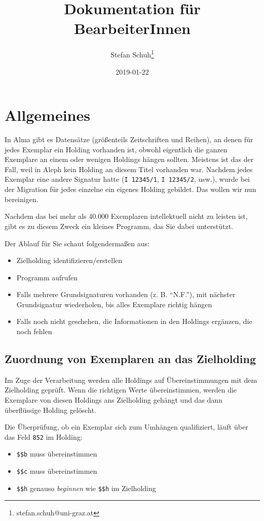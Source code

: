 \documentclass[10pt, a4paper]{scrartcl}
\author{Stefan Schuh\thanks{stefan.schuh@uni-graz.at}}
\date{2019-01-22}
\title{Dokumentation für BearbeiterInnen}
\begin{document}
\maketitle
\tableofcontents

\section{Allgemeines}
\label{sec:org9284342}
In Alma gibt es Datensätze (größenteils Zeitschriften und Reihen), an denen
für jedes Exemplar ein Holding vorhanden ist, obwohl eigentlich die ganzen
Exemplare an einem oder wenigen Holdings hängen sollten. Meistens ist das
der Fall, weil in Aleph kein Holding an diesem Titel vorhanden war. Nachdem
jedes Exemplar eine andere Signatur hatte (\texttt{I 12345/1}, \texttt{I 12345/2}, usw.),
wurde bei der Migration für jedes einzelne ein eigenes Holding gebildet. Das
wollen wir nun bereinigen.

Nachdem das bei mehr als 40.000 Exemplaren intellektuell nicht zu leisten
ist, gibt es zu diesem Zweck ein kleines Programm, das Sie dabei
unterstützt.

Der Ablauf für Sie schaut folgendermaßen aus:

\begin{itemize}
\item Zielholding identifizieren/erstellen
\item Programm aufrufen
\item Falls mehrere Grundsignaturen vorhanden (z. B. "`N.F."'), mit nächster
Grundsignatur wiederholen, bis alles Exemplare richtig hängen
\item Falls noch nicht geschehen, die Informationen in den Holdings ergänzen,
die noch fehlen
\end{itemize}

\subsection{Zuordnung von Exemplaren an das Zielholding}
\label{sec:org47f1899}
Im Zuge der Verarbeitung werden alle Holdings auf Übereinstimmungen mit dem
Zielholding geprüft. Wenn die richtigen Werte übereinstimmen, werden die
Exemplare von diesen Holdings ans Zielholding gehängt und das dann
überflüssige Holding gelöscht.

Die Überprüfung, ob ein Exemplar sich zum Umhängen qualifiziert, läuft
über das Feld \texttt{852} im Holding:

\begin{itemize}
\item \texttt{\$\$b} muss übereinstimmen
\item \texttt{\$\$c} muss übereinstimmen
\item \texttt{\$\$h} genauso \emph{beginnen} wie \texttt{\$\$h} im Zielholding
\end{itemize}
\end{document}
